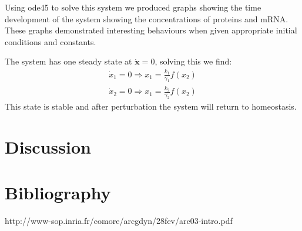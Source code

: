 \documentclass[]{article}
\begin{document}

Using ode45 to solve this system we produced graphs showing the time development of the system showing the concentrations of proteins and mRNA. These graphs demonstrated interesting behaviours when given appropriate initial conditions and constants.

The system has one steady state at $\mathbf{\dot{x}}=0$, solving this we find:
	\begin{align}
		\dot{x}_1=0 \Rightarrow x_1=\frac{k_1}{\gamma_1}f(x_2)\\
		\dot{x}_2=0 \Rightarrow x_1=\frac{k_2}{\gamma_2}f(x_2)
	\end{align}
This state is stable and after perturbation the system will return to homeostasis.
\section*{Discussion}

\section*{Bibliography}





http://www-sop.inria.fr/comore/arcgdyn/28fev/arc03-intro.pdf
\end{document}
